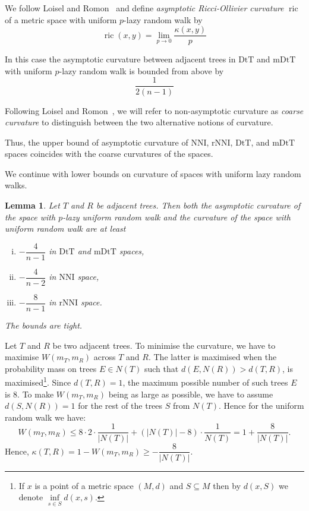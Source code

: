 \documentclass{amsart}
\newtheorem{lemma}{Lemma}
\newcommand{\dts}{\mathrm{DtT}}
\newcommand{\nni}{\mathrm{NNI}}
\newcommand{\rnni}{\mathrm{rNNI}}
\newcommand{\mdts}{\mathrm{mDtT}}
\newcommand{\ric}{\operatorname{ric}}
\begin{document}
We follow Loisel and Romon~\cite{Loisel2014-gu} and define {\em asymptotic Ricci-Ollivier curvature} $\ric$ of a metric space with uniform $p$-lazy random walk by 
\[
\ric(x,y) = \lim_{p\to0} \frac{\kappa(x,y)}{p}
\]

In this case the asymptotic curvature between adjacent trees in $\dts$ and $\mdts$ with uniform $p$-lazy random walk is bounded from above by
\[
\frac{1}{2(n-1)}
\]

Following Loisel and Romon~\cite{Loisel2014-gu}, we will refer to non-asymptotic curvature as {\em coarse curvature}  to distinguish between the two alternative notions of curvature.


Thus, the upper bound of asymptotic curvature of $\nni$, $\rnni$, $\dts$, and $\mdts$ spaces coincides with the coarse curvatures of the spaces.

We continue with lower bounds on curvature of spaces with uniform lazy random walks.

\begin{lemma}\label{uniformLower}
Let $T$ and $R$ be adjacent trees.
Then both the asymptotic curvature of the space with $p$-lazy uniform random walk and the curvature of the space with uniform random walk are at least 
\begin{enumerate}[(i)]
\item $-\dfrac{4}{n-1}$ in $\dts$ and $\mdts$ spaces,
\item $-\dfrac{4}{n-2}$ in $\nni$ space,
\item $-\dfrac{8}{n-1}$ in $\rnni$ space. 
\end{enumerate}

The bounds are tight.
\end{lemma}

\proof
Let $T$ and $R$ be two adjacent trees. To minimise the curvature, we have
to maximise $W(m_T, m_R)$ across $T$ and $R$. The latter is maximised when the probability mass
on trees $E\in N(T)$ such that $d(E, N(R)) > d(T, R)$, is
maximised\footnote{If $x$ is a point of a metric space $(M,d)$ and
$S \subseteq M$ then by $d(x,S)$ we denote $\inf\limits_{s \in S} d(x,s)$.}.
Since $d(T, R) = 1$, the maximum possible number of such trees $E$ is
$8$. To make $W(m_T,m_R)$ being as large as possible, we have to assume
$d(S, N(R)) = 1$ for the rest of the trees $S$ from $N(T)$.
Hence for the uniform random walk we have:
\[
W(m_T,m_R)\leq 8 \cdot 2 \cdot \frac{1}{|N(T)|} +
(|N(T)| - 8) \cdot \frac{1}{N(T)} = 1 + \dfrac{8}{|N(T)|}.
\]
Hence, $\kappa(T,R) = 1 - W(m_T,m_R) \geq - \dfrac{8}{|N(T)|}$.
\end{document}
